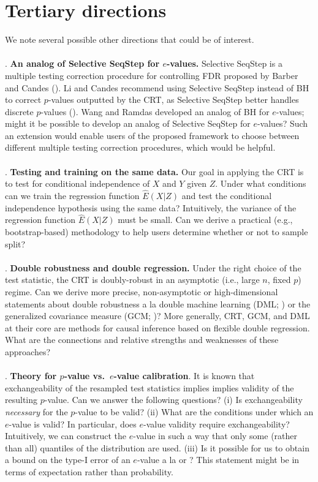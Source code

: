 \documentclass[12pt]{article}
\begin{document}
\section*{Tertiary directions}
We note several possible other directions that could be of interest.
\\ \\ . \textbf{An analog of Selective SeqStep for $e$-values.}  Selective SeqStep is a multiple testing correction procedure for controlling FDR proposed by Barber and Candes (\cite{Barber2015}). Li and Candes recommend using Selective SeqStep instead of BH to correct $p$-values outputted by the CRT, as Selective SeqStep better handles discrete $p$-values (\cite{Li2021}). Wang and Ramdas developed an analog of BH for $e$-values; might it be possible to develop an analog of Selective SeqStep for $e$-values? Such an extension would enable users of the proposed framework to choose between different multiple testing correction procedures, which would be helpful.
\\ \\ . \textbf{Testing and training on the same data.} Our goal in applying the CRT is to test for conditional independence of $X$ and $Y$ given $Z$. Under what conditions can we train the regression function $\hat{E}(X|Z)$ and test the conditional independence hypothesis using the same data? Intuitively, the variance of the regression function $\hat{E}(X|Z)$ must be small. Can we derive a practical (e.g., bootstrap-based) methodology to help users determine whether or not to sample split?
\\ \\ . \textbf{Double robustness and double regression.} Under the right choice of the test statistic, the CRT is doubly-robust in an asymptotic (i.e., large $n$, fixed $p$) regime. Can we derive more precise, non-asymptotic or high-dimensional statements about double robustness a la double machine learning (DML; \cite{Chernozhukov2018}) or the generalized covariance measure (GCM; \cite{Shah2020})? More generally, CRT, GCM, and DML at their core are methods for causal inference based on flexible double regression. What are the connections and relative strengths and weaknesses of these approaches?
\\ \\ . \textbf{Theory for $p$-value vs.\
 $e$-value calibration}. It is known that exchangeability of the resampled test statistics implies implies validity of the resulting $p$-value. Can we answer the following questions? (i) Is exchangeability \textit{necessary} for the $p$-value to be valid? (ii) What are the conditions under which an $e$-value is valid? In particular, does $e$-value validity require exchangeability? Intuitively, we can construct the $e$-value in such a way that only some (rather than all) quantiles of the distribution are used. (iii) Is it possible for us to obtain a bound on the type-I error of an $e$-value a la \textcite{Berrett2020} or \textcite{Kim2021}? This statement might be in terms of expectation rather than probability.
\end{document}
